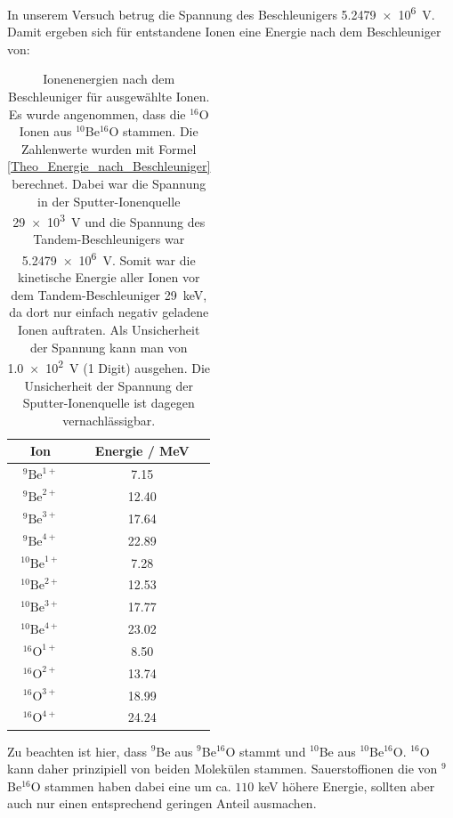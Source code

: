 In unserem Versuch betrug die Spannung des Beschleunigers \SI{5.2479e6}{\volt}.
Damit ergeben sich für entstandene Ionen eine Energie nach dem Beschleuniger von:
\begin{table}[H]
  \centering
  \caption{Ionenenergien nach dem Beschleuniger für ausgewählte Ionen. Es wurde angenommen, dass die $^{16}$O Ionen aus $^{10}$Be$^{16}$O stammen. Die Zahlenwerte wurden mit Formel \ref{Theo_Energie_nach_Beschleuniger} berechnet. Dabei war die Spannung in der Sputter-Ionenquelle \SI{29e3}{\volt} und die Spannung des Tandem-Beschleunigers war \SI{5.2479e6}{\volt}. Somit war die kinetische Energie aller Ionen vor dem Tandem-Beschleuniger \SI{29}{\kilo\electronvolt}, da dort nur einfach negativ geladene Ionen auftraten. Als Unsicherheit der Spannung kann man von \SI{1.0e2}{\volt} (1 Digit) ausgehen. Die Unsicherheit der Spannung der Sputter-Ionenquelle ist dagegen vernachlässigbar.}
  \begin{tabular}{|c|c|}
    \hline
    Ion & Energie / \si{\mega\electronvolt} \\
    \hline
    $^{9}\text{Be}^{1+}$ & \num{7.15} \\
    $^{9}\text{Be}^{2+}$ & \num{12.40} \\
    $^{9}\text{Be}^{3+}$ & \num{17.64} \\
    $^{9}\text{Be}^{4+}$ & \num{22.89} \\
    \hline
    $^{10}\text{Be}^{1+}$ & \num{7.28} \\
    $^{10}\text{Be}^{2+}$ & \num{12.53} \\
    $^{10}\text{Be}^{3+}$ & \num{17.77} \\
    $^{10}\text{Be}^{4+}$ & \num{23.02} \\
    \hline
    $^{16}\text{O}^{1+}$ & \num{8.50} \\
    $^{16}\text{O}^{2+}$ & \num{13.74} \\
    $^{16}\text{O}^{3+}$ & \num{18.99} \\
    $^{16}\text{O}^{4+}$ & \num{24.24} \\
    \hline
  \end{tabular}
  \label{Auswertung_tab_Ionenenergien_nach_Besch}
\end{table}

Zu beachten ist hier, dass $^9$Be aus $^{9}$Be$^{16}$O stammt und $^{10}$Be aus $^{10}$Be$^{16}$O.
$^{16}$O kann daher prinzipiell von beiden Molekülen stammen.
Sauerstoffionen die von $^{9}$Be$^{16}$O stammen haben dabei eine um ca. $110$ keV höhere Energie, sollten aber auch nur einen entsprechend geringen Anteil ausmachen.

